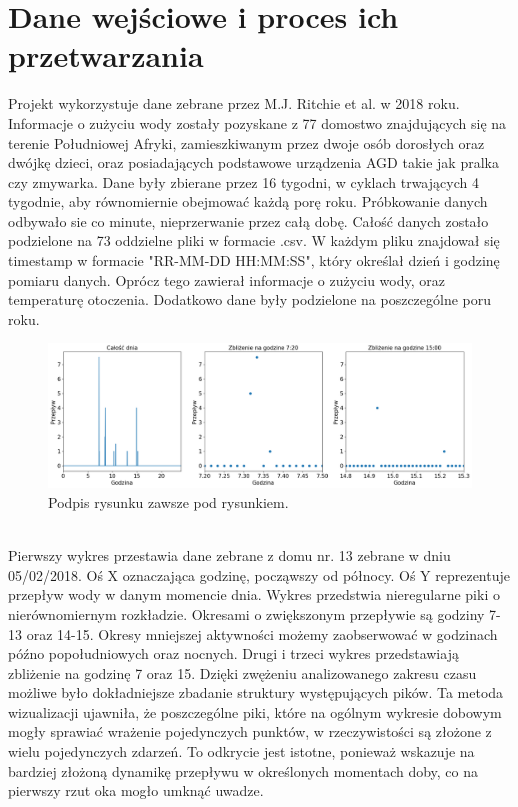 \documentclass[a4paper,twoside,12pt]{book}
\begin{document}
\section{Dane wejściowe i proces ich przetwarzania}
Projekt wykorzystuje dane zebrane przez M.J. Ritchie et al.\cite{bib:artykul_dane} w 2018 roku. Informacje o zużyciu wody zostały pozyskane z 77 domostwo znajdujących się na terenie Południowej Afryki, zamieszkiwanym przez dwoje osób dorosłych oraz dwójkę dzieci, oraz posiadających podstawowe urządzenia AGD takie jak pralka czy zmywarka. Dane były zbierane przez 16 tygodni, w cyklach trwających 4 tygodnie, aby równomiernie obejmować każdą porę roku. Próbkowanie danych odbywało sie co minute, nieprzerwanie przez całą dobę. Całość danych zostało podzielone na 73 oddzielne pliki w formacie .csv. W każdym pliku znajdował się timestamp w formacie "RR-MM-DD HH:MM:SS", który określał dzień i godzinę pomiaru danych. Oprócz tego zawierał informacje o zużyciu wody, oraz temperaturę otoczenia. Dodatkowo dane były podzielone na poszczególne poru roku.\\
\begin{figure}[!h]
  \centering
  \includegraphics[width=1\textwidth]{img/Dane_nowe_disp.png}
  \caption{Podpis rysunku zawsze pod rysunkiem.}
  \label{fig:etykieta-rysunku}
\end{figure}\\
Pierwszy wykres przestawia dane zebrane z domu nr. 13 zebrane w dniu 05/02/2018. Oś X oznaczająca godzinę, począwszy od północy. Oś Y reprezentuje przepływ wody w danym momencie dnia. Wykres przedstwia nieregularne piki o nierównomiernym rozkładzie. Okresami o zwiększonym przepływie są godziny 7-13 oraz 14-15. Okresy mniejszej aktywności możemy zaobserwować w godzinach późno popołudniowych oraz nocnych. Drugi i trzeci wykres przedstawiają zbliżenie na godzinę 7 oraz 15. Dzięki zwężeniu analizowanego zakresu czasu możliwe było dokładniejsze zbadanie struktury występujących pików. Ta metoda wizualizacji ujawniła, że poszczególne piki, które na ogólnym wykresie dobowym mogły sprawiać wrażenie pojedynczych punktów, w rzeczywistości są złożone z wielu pojedynczych zdarzeń. To odkrycie jest istotne, ponieważ wskazuje na bardziej złożoną dynamikę przepływu w określonych momentach doby, co na pierwszy rzut oka mogło umknąć uwadze.\\
\end{document}
